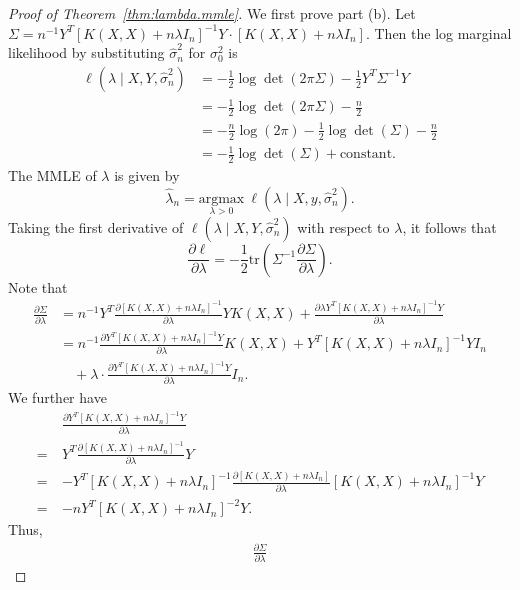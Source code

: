 \documentclass[12pt]{article}
\newcommand{\tr}{\mathrm{tr}}
\theoremstyle{plain}
\theoremstyle{nonitalicremark}
\begin{document}
\begin{appendices}
\begin{proof}[Proof of Theorem~\ref{thm:lambda.mmle}]
We first prove part (b). Let $\Sigma = n^{-1} Y^T[K(X,X)+n\lambda I_n]^{-1}Y\cdot[K(X,X)+n\lambda I_n]$. Then the log marginal likelihood by substituting $\hat\sigma_n^2$ for $\sigma_0^2$ is
\begin{align}
\ell(\lambda\mid X, Y, \hat\sigma_n^2) &= -\frac{1}{2}\log\det(2\pi\Sigma)-\frac{1}{2}Y^T\Sigma^{-1}Y\\
&=-\frac{1}{2}\log\det(2\pi\Sigma)-\frac{n}{2}\\
&=-\frac{n}{2}\log(2\pi)-\frac{1}{2}\log\det(\Sigma)-\frac{n}{2}\\
&=-\frac{1}{2}\log\det(\Sigma) + \text{constant}.
\end{align}
The MMLE of $\lambda$ is given by
\begin{equation}
\hat \lambda_n = \underset{\lambda > 0}{\text{argmax}} \
\ell(\lambda \mid X, y, \hat\sigma_n^2).
\end{equation}
Taking the first derivative of $\ell(\lambda\mid X, Y, \hat\sigma_n^2)$ with respect to $\lambda$, it follows that
\begin{equation}\label{eq:derivative}
\frac{\partial \ell}{\partial \lambda}=-\frac{1}{2}\tr\left(\Sigma^{-1}\frac{\partial \Sigma}{\partial \lambda}\right).
\end{equation}
Note that
\begin{align}
\frac{\partial \Sigma}{\partial \lambda}&=n^{-1}Y^T\frac{\partial [K(X,X)+n\lambda I_n]^{-1}}{\partial \lambda}Y K(X,X)+\frac{\partial \lambda Y^T[K(X,X)+n\lambda I_n]^{-1}Y}{\partial \lambda}\\
&=n^{-1}\frac{\partial Y^T[K(X,X)+n\lambda I_n]^{-1}Y}{\partial \lambda} K(X,X)+Y^T[K(X,X)+n\lambda I_n]^{-1}Y I_n\\
&\quad +\lambda\cdot \frac{\partial Y^T[K(X,X)+n\lambda I_n]^{-1}Y}{\partial \lambda}I_n.
\end{align}
We further have
\begin{align}
&\frac{\partial Y^T[K(X,X)+n\lambda I_n]^{-1}Y}{\partial \lambda}\\
=\ &Y^T\frac{\partial [K(X,X)+n\lambda I_n]^{-1}}{\partial \lambda}Y\\
=\ &-Y^T [K(X,X)+n\lambda I_n]^{-1} \frac{\partial [K(X,X)+n\lambda I_n]}{\partial\lambda} [K(X,X)+n\lambda I_n]^{-1}Y\\
=\ &-nY^T [K(X,X)+n\lambda I_n]^{-2}Y.
\end{align}
Thus,
\begin{align}
\frac{\partial \Sigma}{\partial \lambda}

\end{align}
\end{proof}
\end{appendices}
\end{document}
